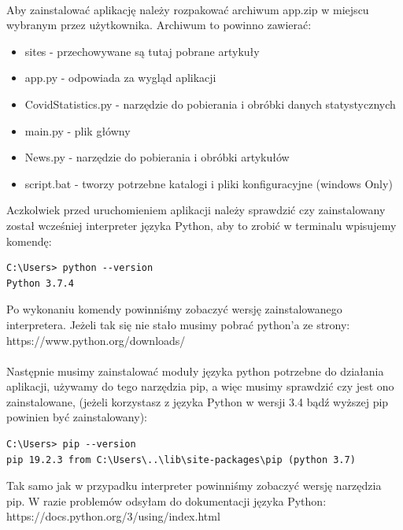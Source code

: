 \documentclass{article}
\begin{document}
\paragraph{}
Aby zainstalować aplikację należy rozpakować archiwum app.zip w miejscu wybranym przez użytkownika.
Archiwum to powinno zawierać:
\begin{itemize}
    \item sites - przechowywane są tutaj pobrane artykuły
    \item app.py - odpowiada za wygląd aplikacji
    \item CovidStatistics.py - narzędzie do pobierania i obróbki danych statystycznych
    \item main.py - plik główny
    \item News.py - narzędzie do pobierania i obróbki artykułów
    \item script.bat - tworzy potrzebne katalogi i pliki konfiguracyjne (windows Only)
\end{itemize}
Aczkolwiek przed uruchomieniem aplikacji należy sprawdzić czy zainstalowany został wcześniej interpreter języka Python, 
aby to zrobić w terminalu wpisujemy komendę:

\begin{verbatim}
C:\Users> python --version
Python 3.7.4
\end{verbatim}

Po wykonaniu komendy powinniśmy zobaczyć wersję zainstalowanego interpretera. Jeżeli tak się nie stało musimy pobrać python'a ze strony:\\
https://www.python.org/downloads/

\paragraph{}
Następnie musimy zainstalować moduły języka python potrzebne do działania aplikacji,
 używamy do tego narzędzia pip, a więc musimy sprawdzić czy jest ono zainstalowane, (jeżeli korzystasz z języka Python w wersji 3.4 bądź wyższej pip powinien być zainstalowany):

\begin{verbatim}
C:\Users> pip --version
pip 19.2.3 from C:\Users\..\lib\site-packages\pip (python 3.7)
\end{verbatim}

Tak samo jak w przypadku interpreter powinniśmy zobaczyć wersję narzędzia pip. W razie problemów odsyłam do dokumentacji języka Python:\\ 
https://docs.python.org/3/using/index.html
\end{document}
